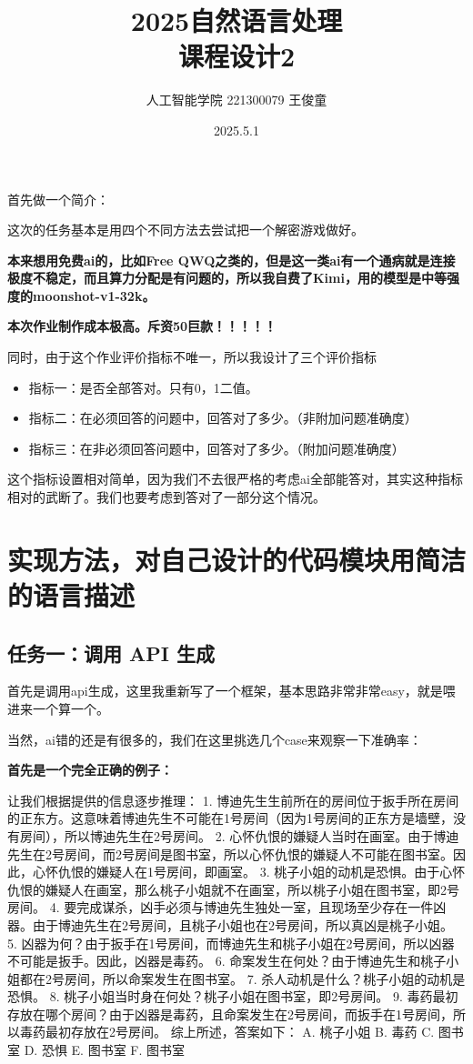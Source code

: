 \documentclass[answers]{exam}  %
\title{2025自然语言处理 \\ 课程设计2}
\date{2025.5.1}
\author{人工智能学院 221300079 王俊童}
\begin{document}
\maketitle

首先做一个简介：

这次的任务基本是用四个不同方法去尝试把一个解密游戏做好。

\textbf{本来想用免费ai的，比如Free QWQ之类的，但是这一类ai有一个通病就是连接极度不稳定，而且算力分配是有问题的，所以我自费了Kimi，用的模型是中等强度的moonshot-v1-32k。}

\textbf{本次作业制作成本极高。斥资50巨款！！！！！}

同时，由于这个作业评价指标不唯一，所以我设计了三个评价指标
\begin{itemize}
    \item 指标一：是否全部答对。只有0，1二值。
    \item 指标二：在必须回答的问题中，回答对了多少。（非附加问题准确度）
    \item 指标三：在非必须回答问题中，回答对了多少。（附加问题准确度）
\end{itemize}
这个指标设置相对简单，因为我们不去很严格的考虑ai全部能答对，其实这种指标相对的武断了。我们也要考虑到答对了一部分这个情况。

\section{实现方法，对自己设计的代码模块用简洁的语言描述}
\subsection{任务一：调用 API 生成}

首先是调用api生成，这里我重新写了一个框架，基本思路非常非常easy，就是喂进来一个算一个。

当然，ai错的还是有很多的，我们在这里挑选几个case来观察一下准确率：

\textbf{首先是一个完全正确的例子：}

让我们根据提供的信息逐步推理： 1. 博迪先生生前所在的房间位于扳手所在房间的正东方。这意味着博迪先生不可能在1号房间（因为1号房间的正东方是墙壁，没有房间），所以博迪先生在2号房间。 2. 心怀仇恨的嫌疑人当时在画室。由于博迪先生在2号房间，而2号房间是图书室，所以心怀仇恨的嫌疑人不可能在图书室。因此，心怀仇恨的嫌疑人在1号房间，即画室。 3. 桃子小姐的动机是恐惧。由于心怀仇恨的嫌疑人在画室，那么桃子小姐就不在画室，所以桃子小姐在图书室，即2号房间。 4. 要完成谋杀，凶手必须与博迪先生独处一室，且现场至少存在一件凶器。由于博迪先生在2号房间，且桃子小姐也在2号房间，所以真凶是桃子小姐。 5. 凶器为何？由于扳手在1号房间，而博迪先生和桃子小姐在2号房间，所以凶器不可能是扳手。因此，凶器是毒药。 6. 命案发生在何处？由于博迪先生和桃子小姐都在2号房间，所以命案发生在图书室。 7. 杀人动机是什么？桃子小姐的动机是恐惧。 8. 桃子小姐当时身在何处？桃子小姐在图书室，即2号房间。 9. 毒药最初存放在哪个房间？由于凶器是毒药，且命案发生在2号房间，而扳手在1号房间，所以毒药最初存放在2号房间。 综上所述，答案如下： A. 桃子小姐 B. 毒药 C. 图书室 D. 恐惧 E. 图书室 F. 图书室
\end{document}
